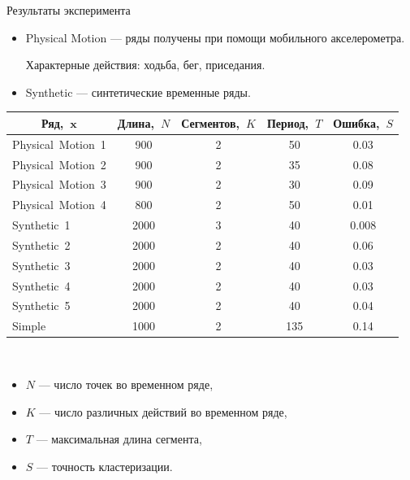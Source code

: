\documentclass[9pt,pdf,hyperref={unicode}]{beamer}
\begin{document}
\begin{frame}{Результаты эксперимента}

\begin{itemize}
\justifying
	\item Physical Motion --- ряды получены при помощи мобильного акселерометра.  
	
	Характерные действия: ходьба, бег, приседания.
	\item Synthetic --- синтетические временные ряды.
\end{itemize}

\begin{table}[h!t]
\begin{center}
\label{table:experiment:1}
\begin{tabular}{|c|c|c|c|c|}
\hline
	Ряд,~$\textbf{x}$ &Длина,~$N$& Сегментов,~$K$& Период,~$T$ & Ошибка,~$S$\\
	\hline
	\multicolumn{1}{|l|}{Physical~Motion~1}
	& 900& 2& 50& 0.03\\
	\hline
	\multicolumn{1}{|l|}{Physical~Motion~2}
	& 900& 2& 35& 0.08\\
	\hline
	\multicolumn{1}{|l|}{Physical~Motion~3}
	& 900& 2& 30& 0.09\\
	\hline
	\multicolumn{1}{|l|}{Physical~Motion~4}
	& 800& 2& 50& 0.01\\
	\hline
	\multicolumn{1}{|l|}{Synthetic~1}
	& 2000& 3& 40& 0.008\\
	\hline
	\multicolumn{1}{|l|}{Synthetic~2}
	& 2000& 2& 40& 0.06\\
	\hline
	\multicolumn{1}{|l|}{Synthetic~3}
	& 2000& 2& 40& 0.03\\
	\hline
	\multicolumn{1}{|l|}{Synthetic~4}
	& 2000& 2& 40& 0.03\\
	\hline
	\multicolumn{1}{|l|}{Synthetic~5}
	& 2000& 2& 40& 0.04\\
	\hline
	\multicolumn{1}{|l|}{Simple}
	& 1000& 2& 135& 0.14\\
\hline

\end{tabular}
\end{center}
\end{table}
~\\
\begin{itemize}
	\item $N$ --- число точек во временном ряде,
	\item $K$ --- число различных действий во временном ряде,
	\item $T$ --- максимальная длина сегмента,
	\item $S$ --- точность кластеризации.
\end{itemize}

\end{frame}
\end{document}
